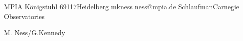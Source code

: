 \documentclass[a4paper]{article}
\begin{document}
%
%
%
{MPIA}
{K\"onigstuhl}
{69117}{Heidelberg}
{mkness}
{ness@mpia.de}
%
{Schlaufman}{Carnegie Observatories}
       
           {M. Ness/G.Kennedy}
\end{document}
